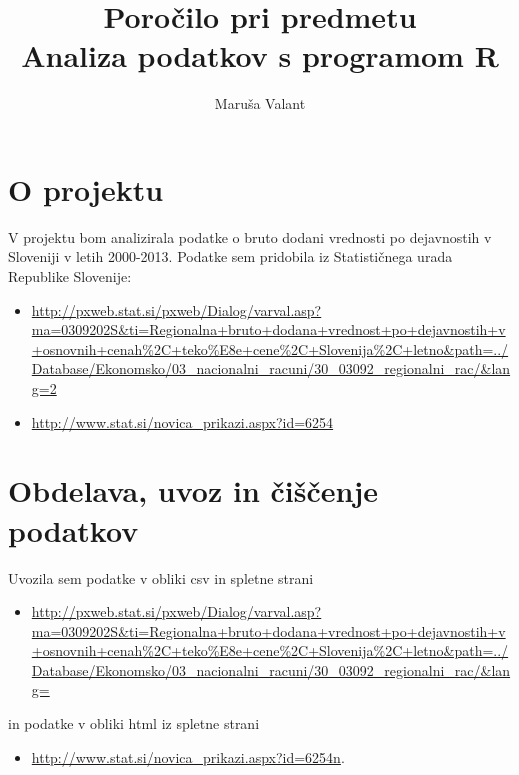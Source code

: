 \documentclass[a4paper, 11pt]{article}
\begin{document}
\title{Poročilo pri predmetu \\
Analiza podatkov s programom R}
\author{Maruša Valant}

\section{O projektu}

V projektu bom analizirala podatke o bruto dodani vrednosti po dejavnostih v Sloveniji v letih 2000-2013. Podatke sem pridobila iz Statističnega urada Republike Slovenije:

\begin{itemize}
\item{\url{http://pxweb.stat.si/pxweb/Dialog/varval.asp?ma=0309202S&ti=Regionalna+bruto+dodana+vrednost+po+dejavnostih+v+osnovnih+cenah%2C+teko%E8e+cene%2C+Slovenija%2C+letno&path=../Database/Ekonomsko/03_nacionalni_racuni/30_03092_regionalni_rac/&lang=2}}
\item{\url{http://www.stat.si/novica_prikazi.aspx?id=6254}}

\end{itemize}

\section{Obdelava, uvoz in čiščenje podatkov}

Uvozila sem podatke v obliki csv in spletne strani

\begin{itemize}
 \item{\url{http://pxweb.stat.si/pxweb/Dialog/varval.asp?ma=0309202S&ti=Regionalna+bruto+dodana+vrednost+po+dejavnostih+v+osnovnih+cenah%2C+teko%E8e+cene%2C+Slovenija%2C+letno&path=../Database/Ekonomsko/03_nacionalni_racuni/30_03092_regionalni_rac/&lang= }} 
\end{itemize}
in podatke v obliki html iz spletne strani 
\begin{itemize}
\item{\url{http://www.stat.si/novica_prikazi.aspx?id=6254n}}.
\end{itemize}
\end{document}
